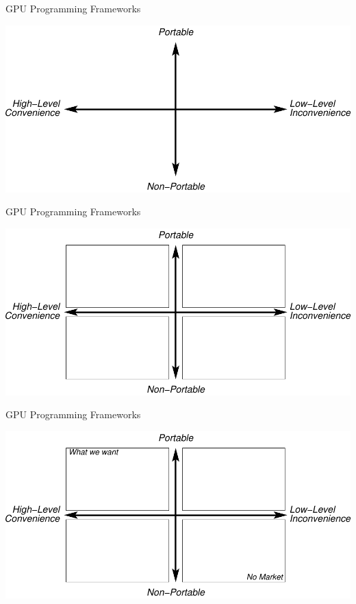 

\begin{frame}[fragile]{GPU Programming Frameworks}
 \begin{center}
  \includegraphics[width=\textwidth]{figures/gpu-programming-comparison}
 \end{center}
\end{frame}

\begin{frame}[fragile]{GPU Programming Frameworks}
 \begin{center}
  \includegraphics[width=\textwidth]{figures/gpu-programming-comparison-1}
 \end{center}
\end{frame}

\begin{frame}[fragile]{GPU Programming Frameworks}
 \begin{center}
  \includegraphics[width=\textwidth]{figures/gpu-programming-comparison-1a}
 \end{center}
\end{frame}

